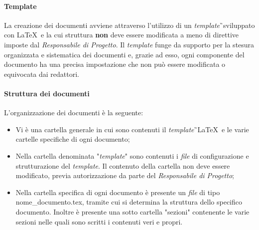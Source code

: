 \paragraph{Template}
La creazione dei documenti avviene attraverso l'utilizzo di un \textit{template}\G\ sviluppato con \LaTeX\ e la cui struttura \textbf{non} deve essere modificata a meno di direttive imposte dal \textit{Responsabile di Progetto}. Il \textit{template} funge da supporto per la stesura organizzata e sistematica dei documenti e, grazie ad esso, ogni componente del documento ha una precisa impostazione che non può essere modificata o equivocata dai redattori.

\paragraph{Struttura dei documenti}
L'organizzazione dei documenti è la seguente: 
\begin{itemize}
	\item Vi è una cartella generale in cui sono contenuti il \textit{template}\G\ \LaTeX\ e le varie cartelle specifiche di ogni documento;
	\item Nella cartella denominata "\textit{template}" sono contenuti i \textit{file} di configurazione e strutturazione del \textit{template}. Il contenuto della cartella non deve essere modificato, previa autorizzazione da parte del \textit{Responsabile di Progetto};
	\item Nella cartella specifica di ogni documento è presente un \textit{file} di tipo nome\_documento.tex, tramite cui si determina la struttura dello specifico documento. Inoltre è presente una sotto cartella "sezioni" contenente le varie sezioni nelle quali sono scritti i contenuti veri e propri.
\end{itemize}

